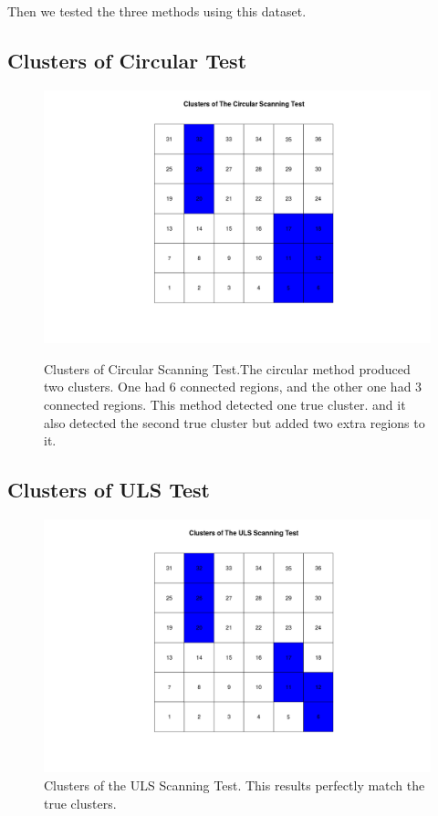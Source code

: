 \documentclass[12pt]{article}
\begin{document}
	Then we tested the three methods using this dataset. \\
	
	\subsection{Clusters of Circular Test } 
	 
	 \begin{figure}[!ht]
	 	
	 	\centering
	 	\includegraphics[scale=0.4]{Ex1_Circular}\\
	 	\caption{Clusters of Circular Scanning Test.The circular method produced two clusters. One had 6 connected regions, and the other one had 3 connected regions. This method detected one true cluster. and it also detected the second true cluster but added two extra regions to it.\label{f:gull}}
	 	
	 \end{figure}
	 
	 
	\subsection{Clusters of ULS Test}
	
	
	
		\begin{figure}[!ht]
			
			\centering
			\includegraphics[scale=0.4]{Ex1_ULS}
			\caption{Clusters of the ULS Scanning Test. This results perfectly match the true clusters. \label{f:gull}}
			
		\end{figure}	
	
\end{document}
